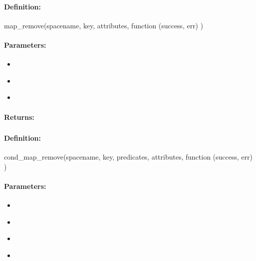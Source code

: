 \paragraph{Definition:}
\begin{javascriptcode}
map_remove(spacename, key, attributes, function (success, err) {})
\end{javascriptcode}
\paragraph{Parameters:}
\begin{itemize}[noitemsep]
\item {}\\

\item {}\\

\item {}\\

\end{itemize}

\paragraph{Returns:}


\pagebreak
\subsubsection{}
\label{api:nodejs:cond_map_remove}


\paragraph{Definition:}
\begin{javascriptcode}
cond_map_remove(spacename, key, predicates, attributes, function (success, err) {})
\end{javascriptcode}
\paragraph{Parameters:}
\begin{itemize}[noitemsep]
\item {}\\

\item {}\\

\item {}\\

\item {}\\

\end{itemize}

